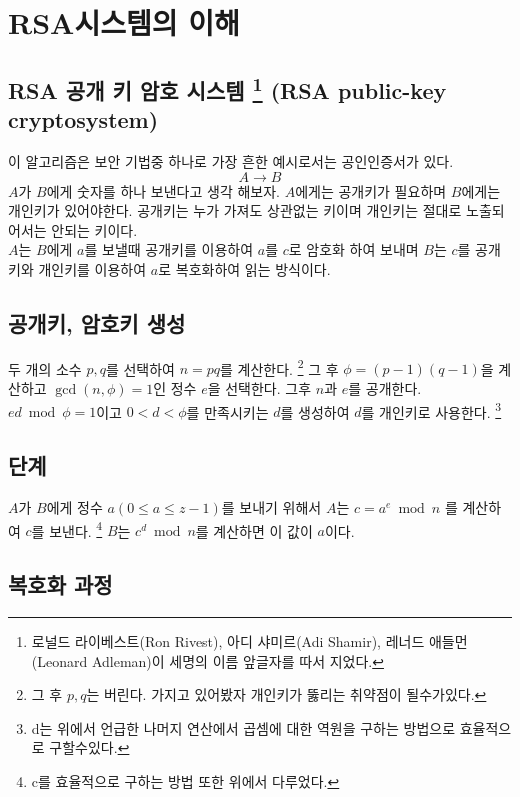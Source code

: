 

\section{RSA시스템의 이해}

\subsection{RSA 공개 키 암호 시스템 
\protect\footnote{로널드 라이베스트(Ron Rivest), 아디 샤미르(Adi Shamir), 레너드 애들먼(Leonard Adleman)이 세명의 이름 앞글자를 따서 지었다.}
(RSA public-key cryptosystem)}

이 알고리즘은 보안 기법중 하나로 가장 흔한 예시로서는 공인인증서가 있다.
    \[A \longrightarrow B\]
$A$가 $B$에게 숫자를 하나 보낸다고 생각 해보자. $A$에게는 공개키가 필요하며 $B$에게는 개인키가 있어야한다. 공개키는 누가 가져도 상관없는 키이며 개인키는 절대로 노출되어서는 안되는 키이다.\\
$A$는 $B$에게 $a$를 보낼때 공개키를 이용하여 $a$를 $c$로 암호화 하여 보내며 $B$는 $c$를 공개키와 개인키를 이용하여 $a$로 복호화하여 읽는 방식이다.



\subsection{공개키, 암호키 생성}
두 개의 소수 $p,q$를 선택하여 $n=pq$를 계산한다.
\footnote{그 후 $p ,q$는 버린다. 가지고 있어봤자 개인키가 뚫리는 취약점이 될수가있다.}
 그 후 $\phi =(p-1)(q-1)$을 계산하고 $\gcd(n,\phi)=1$인 정수 $e$을 선택한다. 그후 $n$과 $e$를 공개한다.
  $ed\bmod \phi =1$이고 $0<d<\phi$를 만족시키는 $d$를 생성하여 $d$를 개인키로 사용한다.
\footnote{d는 위에서 언급한 나머지 연산에서 곱셈에 대한 역원을 구하는 방법으로 효율적으로 구할수있다.}\\


\subsection{단계}
$A$가 $B$에게 정수 $a(0\le a\le z-1)$를 보내기 위해서 $A$는 $c=a^e \bmod n$ 를 계산하여 $c$를 보낸다.
\footnote{c를 효율적으로 구하는 방법 또한 위에서 다루었다.}
$B$는 $c^d \bmod n$를 계산하면 이 값이 $a$이다.\\





\subsection{복호화 과정}

